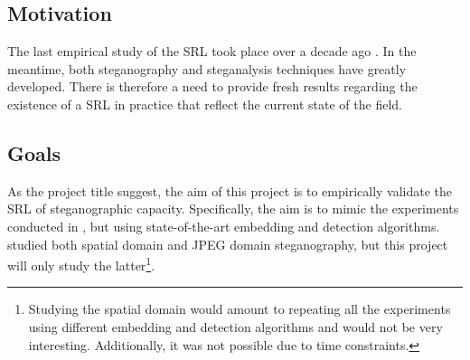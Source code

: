 \documentclass[11pt,a4paper,twoside,openright]{report}
\begin{document}
\subsection{Motivation}

The last empirical study of the SRL took place over a decade ago \cite{2008-paper}. In the meantime, both steganography and steganalysis techniques have greatly developed. There is therefore a need to provide fresh results regarding the existence of a SRL in practice that reflect the current state of the field.

\subsection{Goals} \label{sec:goals}

As the project title suggest, the aim of this project is to empirically validate the SRL of steganographic capacity. Specifically, the aim is to mimic the experiments conducted in \cite{2008-paper}, but using state-of-the-art embedding and detection algorithms. \cite{2008-paper} studied both spatial domain and JPEG domain steganography, but this project will only study the latter\footnote{Studying the spatial domain would amount to repeating all the experiments using different embedding and detection algorithms and would not be very interesting. Additionally, it was not possible due to time constraints.}.
\end{document}
